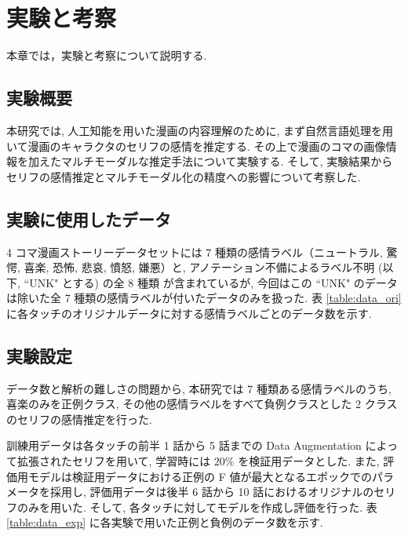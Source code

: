\newpage
\changeindent{0cm}
\section{実験と考察}
\changeindent{2cm}

本章では，実験と考察について説明する.

\changeindent{0cm}
\subsection{実験概要}
\changeindent{2cm}

本研究では, 人工知能を用いた漫画の内容理解のために,
まず自然言語処理を用いて漫画のキャラクタのセリフの感情を推定する.
その上で漫画のコマの画像情報を加えたマルチモーダルな推定手法について実験する.
そして, 実験結果からセリフの感情推定とマルチモーダル化の精度への影響について考察した.

\changeindent{0cm}
\subsection{実験に使用したデータ}
\changeindent{2cm}

4 コマ漫画ストーリーデータセットには 7 種類の感情ラベル（ニュートラル, 驚愕, 喜楽, 恐怖, 悲哀, 憤怒, 嫌悪）と, アノテーション不備によるラベル不明 (以下, ``UNK" とする) の全 8 種類
が含まれているが, 今回はこの ``UNK" のデータは除いた全 7 種類の感情ラベルが付いたデータのみを扱った. 表 \ref{table:data_ori} に各タッチのオリジナルデータに対する感情ラベルごとのデータ数を示す.

\changeindent{0cm}
\subsection{実験設定}
\changeindent{2cm}

データ数と解析の難しさの問題から, 本研究では 7 種類ある感情ラベルのうち,
喜楽のみを正例クラス, その他の感情ラベルをすべて負例クラスとした
2 クラスのセリフの感情推定を行った.

訓練用データは各タッチの前半 1 話から 5 話までの
Data Augmentation によって拡張されたセリフを用いて, 学習時には $20\%$ を検証用データとした.
また, 評価用モデルは検証用データにおける正例の F 値が最大となるエポックでのパラメータを採用し,
評価用データは後半 6 話から 10 話におけるオリジナルのセリフのみを用いた. そして, 各タッチに対してモデルを作成し評価を行った.
表 \ref{table:data_exp} に各実験で用いた正例と負例のデータ数を示す.



